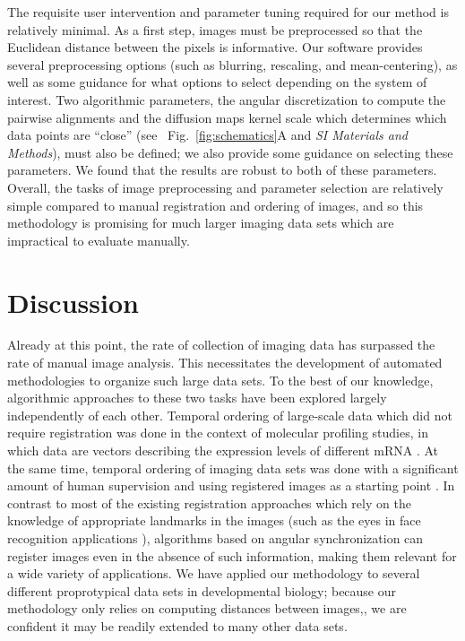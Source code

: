 \documentclass[twocolumn, 10pt]{article}
\newcommand{\SI}[0]{\textit{SI Materials and Methods}}
\newcommand{\fig}[0]{Fig.}
\begin{document}
The requisite user intervention and parameter tuning required for our method is relatively minimal.
%
As a first step, images must be preprocessed so that the Euclidean distance between the pixels is informative.
%
Our software provides several preprocessing options (such as blurring, rescaling, and mean-centering), as well as some guidance for what options to select depending on the system of interest. 
%
Two algorithmic parameters, the angular discretization to compute the pairwise alignments and the diffusion maps kernel scale which determines which data points are ``close'' (see ~\fig~\ref{fig:schematics}A and \SI), must also be defined; we also provide some guidance on selecting these parameters.
%
We found that the results are robust to both of these parameters.
%
Overall, the tasks of image preprocessing and parameter selection are relatively simple compared to manual registration and ordering of images, and so this methodology is promising for much larger imaging data sets which are impractical to evaluate manually. 




\section*{Discussion}

Already at this point, the rate of collection of imaging data has surpassed the rate of manual image analysis.
%
This necessitates the development of automated methodologies to organize such large data sets. 
%
To the best of our knowledge, algorithmic approaches to these two tasks have been explored largely independently of each other. 
%
Temporal ordering of large-scale data which did not require registration was done in the context of molecular profiling studies, in which data are vectors describing the expression levels of different mRNA \citep{anavy2014blind, trapnell2014dynamics, gupta2008extracting}.
%
At the same time, temporal ordering of imaging data sets was done with a significant amount of human supervision and using registered images as a starting point \citep{yuan2014automated, surkova2008characterization}.  
%
%
In contrast to most of the existing registration approaches which rely on the knowledge of appropriate landmarks in the images \citep{ian1998statistical} (such as the eyes in face recognition applications \citep{zhao2003face}), algorithms based on angular synchronization can register images even in the absence of such information, making them relevant for a wide variety of applications. 
%
We have applied our methodology to several different proprotypical data sets in developmental biology; because our methodology only relies on computing distances between images,, we are confident it may be readily extended to many other data sets. 
\end{document}
